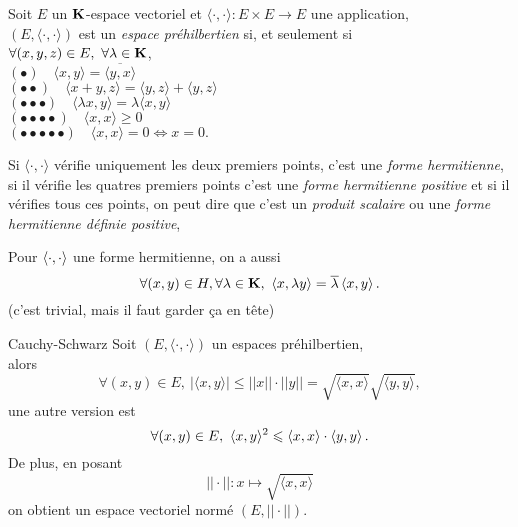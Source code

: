 \documentclass[a4paper,11pt, twoside]{article}
\begin{document}
\begin{Def}
  Soit $E$ un $\mathbf K$-espace vectoriel et $\langle \cdot,\cdot\rangle:E\times E\longrightarrow E$ une application,\\

  $(E,\langle \cdot,\cdot\rangle)$ est un \emph{espace préhilbertien} si, et seulement si \\
  $\forall (x,y,z)\in E,\ \forall \lambda\in\mathbf K$,\\
  $(\bullet)\quad \langle x,y\rangle =\overline{\langle y,x\rangle}$\\
  $(\bullet\bullet)\quad \langle x+y,z\rangle =\langle y,z\rangle+\langle y,z\rangle$\\
  $(\bullet\bullet\bullet)\quad \langle \lambda x,y\rangle =\lambda\langle x,y\rangle$\\
  $(\bullet\bullet\bullet\bullet)\quad \langle x,x\rangle \geqslant 0$\\
  $(\bullet\bullet\bullet\bullet\bullet)\quad \langle x,x\rangle = 0\Leftrightarrow x=0.$\\
\end{Def}


\begin{RQ}
  Si $\langle \cdot,\cdot\rangle$ vérifie uniquement les deux premiers points, c'est une \emph{forme hermitienne}, si il vérifie les quatres premiers points c'est une \emph{forme hermitienne positive} et si il vérifies tous ces points, on peut dire que c'est un \emph{produit scalaire} ou une \emph{forme hermitienne définie positive}, 
\end{RQ}


\begin{RQ}
  Pour $\left\langle \cdot,\cdot \right\rangle$ une forme hermitienne, on a aussi 
  $$\forall (x,y)\in H,\forall \lambda\in \mathbf K,\ \left\langle x,\lambda y \right\rangle=\overline{\lambda}\left\langle x,y \right\rangle.$$
  (c'est trivial, mais il faut garder ça en tête)
\end{RQ}


\begin{propC}{Cauchy-Schwarz}
  Soit $(E,\langle \cdot,\cdot\rangle)$ un espaces préhilbertien,\\

  alors 
  $$\forall (x,y)\in E,\ |\langle x,y\rangle|\leqslant ||x||\cdot ||y||=\sqrt{\langle x,x\rangle}\sqrt{\langle y,y\rangle},$$
  une autre version est 
  $$\forall (x,y)\in E,\ \langle x,y\rangle^2\leqslant \ps{x,x}\cdot\ps{y,y}.$$
  De plus, en posant 
  $$||\cdot||:x\longmapsto \sqrt{\langle x,x\rangle}$$
  on obtient un espace vectoriel normé $(E,||\cdot||)$.
\end{propC}
\end{document}
